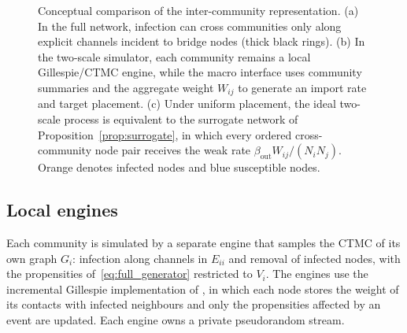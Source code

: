 \documentclass[a4paper,fleqn]{cas-sc}
\begin{document}
\begin{figure}[H]
\caption{Conceptual comparison of the inter-community representation. (a) In the full network, infection can cross communities only along explicit channels incident to bridge nodes (thick black rings). (b) In the two-scale simulator, each community remains a local Gillespie/CTMC engine, while the macro interface uses community summaries and the aggregate weight $W_{ij}$ to generate an import rate and target placement. (c) Under uniform placement, the ideal two-scale process is equivalent to the surrogate network of Proposition~\ref{prop:surrogate}, in which every ordered cross-community node pair receives the weak rate $\beta_{\mathrm{out}}W_{ij}/(N_iN_j)$. Orange denotes infected nodes and blue susceptible nodes.}
\label{fig:schematic}
\end{figure}

\subsection{Local engines}
\label{sec:local}

Each community is simulated by a separate engine that samples the CTMC of its own graph $G_i$: infection along channels in $E_{ii}$ and removal of infected nodes, with the propensities of~\eqref{eq:full_generator} restricted to $V_i$. The engines use the incremental Gillespie implementation of \citet{kuryliak2025simulating}, in which each node stores the weight of its contacts with infected neighbours and only the propensities affected by an event are updated. Each engine owns a private pseudorandom stream.
\end{document}
